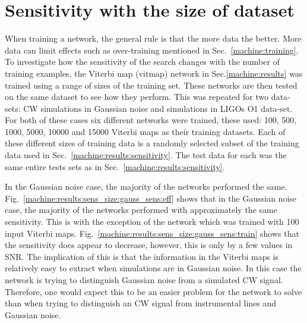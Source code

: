 \section{\label{machine:results:sens_size} Sensitivity with the size of dataset}

When training a network, the general rule is that the more data the better. 
More data can limit effects such as over-training mentioned in Sec.~\ref{machine:training}.
To investigate how the sensitivity of the search changes with the number of training examples, the Viterbi map (vitmap) network in Sec.\ref{machine:results} was trained using a range of sizes of the training set. 
These networks are then tested on the same dataset to see how they perform.
This was repeated for two data-sets: \gls{CW} simulations in Gaussian noise and simulations in \glspl{LIGO} O1 data-set. 
For both of these cases six different networks were trained, these used: 100, 500, 1000, 5000, 10000 and 15000 Viterbi maps as their training datasets.
Each of these different sizes of training data is a randomly selected subset of the training data used in Sec.~\ref{machine:results:sensitivity}.
The test data for each was the same entire tests sets as in Sec.~\ref{machine:results:sensitivity}.

In the Gaussian noise case, the majority of the networks performed the same. 
Fig.~\ref{machine:results:sens_size:gauss_sens:eff} shows that in the Gaussian noise case, the majority of the networks performed with approximately the same sensitivity. 
This is with the exception of the network which was trained with 100 input Viterbi maps. 
Fig.~\ref{machine:results:sens_size:gauss_sens:train} shows that the sensitivity does appear to decrease, however, this is only by a few values in \gls{SNR}.
The implication of this is that the information in the Viterbi maps is relatively easy to extract when simulations are in Gaussian noise. 
In this case the network is trying to distinguish Gaussian noise from a simulated \gls{CW} signal.
Therefore, one would expect this to be an easier problem for the network to solve than when trying to distinguish an \gls{CW} signal from instrumental lines and Gaussian noise. 

